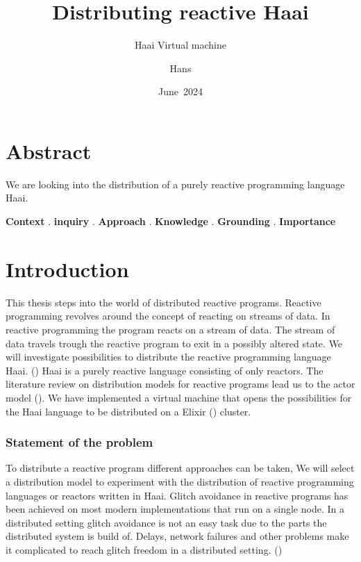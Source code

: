 \documentclass[a4paper]{book}
\title{Distributing reactive Haai}
\subtitle{Haai Virtual machine}
\author{Hans}
\date{June~2024}
\begin{document}
\frontmatter
\maketitle%


\chapter{Abstract}
We are looking into the distribution of a purely reactive programming language Haai. 

\textbf{Context}
.
\textbf{inquiry}
.
\textbf{Approach}
.
\textbf{Knowledge}
.
\textbf{Grounding}
.
\textbf{Importance}



\tableofcontents%

\mainmatter%
\chapter{Introduction}
This thesis steps into the world of distributed reactive programs. Reactive programming revolves around the concept of reacting on streams of data. In reactive programming the program reacts on a stream of data. The stream of data travels trough the reactive program to exit in a possibly altered state. We will investigate possibilities to distribute the reactive programming language Haai. (\cite{oeyen_reactive_2024}) Haai is a purely reactive language consisting of only reactors. The literature review on distribution models for reactive programs lead us to the actor model (\cite{de_koster_43_2016}). We have implemented a virtual machine that opens the possibilities for the Haai language to be distributed on a Elixir (\cite{juric2024elixir}) cluster.
\subsection{Statement of the problem}
To distribute a reactive program different approaches can be taken, We will select a distribution model to experiment with the distribution of reactive programming languages or reactors written in Haai. Glitch avoidance in reactive programs has been achieved on most modern implementations that run on a single node. In a distributed setting glitch avoidance is not an easy task due to the parts the distributed system is build of. Delays, network failures and other problems make it complicated to reach glitch freedom in a distributed setting. (\cite{DBLP:journals/csur/BainomugishaCCMM13})
\end{document}

